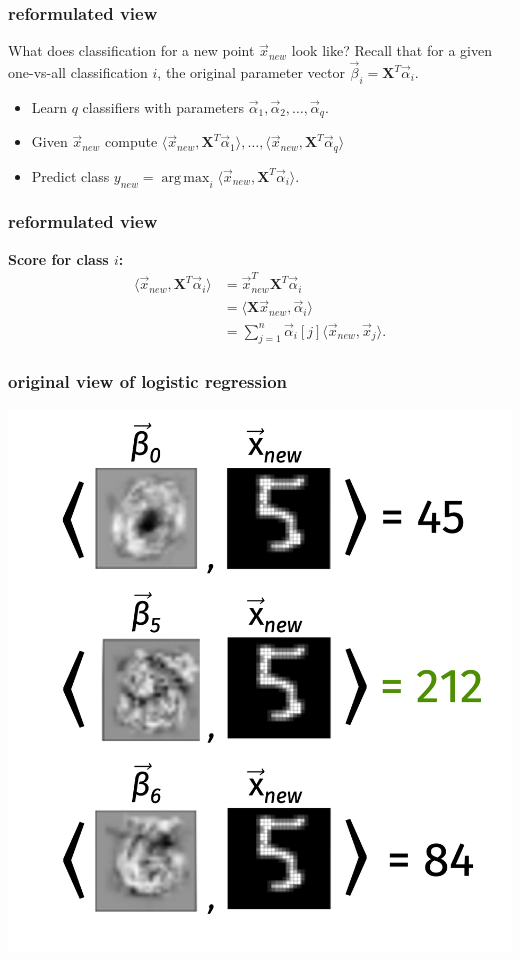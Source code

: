 \documentclass[handout,compress]{beamer}
\newcommand{\bv}[1]{\mathbf{#1}}
\DeclareMathOperator*{\argmax}{arg\,max}
\begin{document}
\begin{frame} 
	\frametitle{reformulated view}
	What does classification for a new point $\vec{x}_{new}$ look like? Recall that for a given one-vs-all classification $i$, the original parameter vector $\vec{\beta}_i = \bv{X}^T\vec{\alpha}_i$.
	
	\begin{itemize}
	\item Learn $q$ classifiers with parameters $\vec{\alpha}_1, \vec{\alpha}_2, \ldots, \vec{\alpha}_q$.
	\item Given $\vec{x}_{new}$ compute $\langle \vec{x}_{new}, \bv{X}^T\vec{\alpha}_1\rangle, \ldots, \langle\vec{x}_{new}, \bv{X}^T\vec{\alpha}_q\rangle$
	\item Predict class $y_{new} = \argmax_i \langle\vec{x}_{new}, \bv{X}^T\vec{\alpha}_i\rangle$.
\end{itemize}
	
\end{frame}

\begin{frame} 
	\frametitle{reformulated view}
	\textbf{Score for class $i$:}
	\begin{align*}
	\langle\vec{x}_{new}, \bv{X}^T\vec{\alpha}_i\rangle &=\vec{x}_{new}^T \bv{X}^T\vec{\alpha}_i \\
	&= \langle\bv{X}\vec{x}_{new}, \vec{\alpha}_i\rangle \\
	&= \sum_{j=1}^n \vec{\alpha}_i[j] \langle\vec{x}_{new}, \vec{x}_j\rangle.
	\end{align*}
%	
\end{frame}

\begin{frame}
	\frametitle{original view of logistic regression}
	\begin{center}
		\includegraphics[width=.5\textwidth]{orig_form.png}
	\end{center}
\end{frame}
\end{document}
